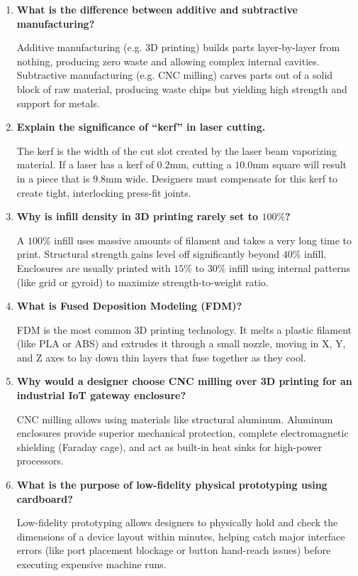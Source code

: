 \documentclass[12pt,a4paper]{article}
\newcommand{\Q}[1]{\textbf{#1}\par\noindent\ignorespaces}
\begin{document}
\begin{tcolorbox}[exambox, title={\textbf{Frequently Asked / Viva Questions}}]
\begin{enumerate}[leftmargin=*, topsep=0pt, label=\textbf{Q\arabic*.}, itemsep=6pt]
  \item \Q{What is the difference between additive and subtractive manufacturing?}
        Additive manufacturing (e.g. 3D printing) builds parts layer-by-layer from nothing, producing zero waste and allowing complex internal cavities. Subtractive manufacturing (e.g. CNC milling) carves parts out of a solid block of raw material, producing waste chips but yielding high strength and support for metals.
        
  \item \Q{Explain the significance of ``kerf'' in laser cutting.}
        The kerf is the width of the cut slot created by the laser beam vaporizing material. If a laser has a kerf of $0.2\text{mm}$, cutting a $10.0\text{mm}$ square will result in a piece that is $9.8\text{mm}$ wide. Designers must compensate for this kerf to create tight, interlocking press-fit joints.
        
  \item \Q{Why is infill density in 3D printing rarely set to $100\%$?}
        A $100\%$ infill uses massive amounts of filament and takes a very long time to print. Structural strength gains level off significantly beyond $40\%$ infill. Enclosures are usually printed with $15\%$ to $30\%$ infill using internal patterns (like grid or gyroid) to maximize strength-to-weight ratio.
        
  \item \Q{What is Fused Deposition Modeling (FDM)?}
        FDM is the most common 3D printing technology. It melts a plastic filament (like PLA or ABS) and extrudes it through a small nozzle, moving in X, Y, and Z axes to lay down thin layers that fuse together as they cool.
        
  \item \Q{Why would a designer choose CNC milling over 3D printing for an industrial IoT gateway enclosure?}
        CNC milling allows using materials like structural aluminum. Aluminum enclosures provide superior mechanical protection, complete electromagnetic shielding (Faraday cage), and act as built-in heat sinks for high-power processors.
        
  \item \Q{What is the purpose of low-fidelity physical prototyping using cardboard?}
        Low-fidelity prototyping allows designers to physically hold and check the dimensions of a device layout within minutes, helping catch major interface errors (like port placement blockage or button hand-reach issues) before executing expensive machine runs.
        

\end{enumerate}
\end{tcolorbox}
\end{document}
